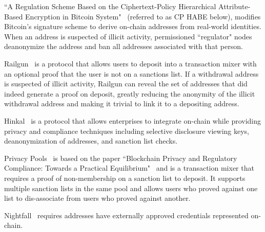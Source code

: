\documentclass[9pt]{extreport}
\begin{document}
``A Regulation Scheme Based on the Ciphertext-Policy Hierarchical Attribute-Based Encryption in Bitcoin System"~\cite{8314106} (referred to as CP HABE below), modifies Bitcoin's signature scheme to derive on-chain addresses from real-world identities.  When an address is suspected of illicit activity, permissioned ``regulator" nodes deanonymize the address and ban all addresses associated with that person.  

Railgun~\cite{railgun} is a protocol that allows users to deposit into a transaction mixer with an optional proof that the user is not on a sanctions list.  If a withdrawal address is suspected of illicit activity, Railgun can reveal the set of addresses that did indeed generate a proof on deposit, greatly reducing the anonymity of the illicit withdrawal address and making it trivial to link it to a depositing address.  

Hinkal~\cite{hinkal} is a protocol that allows enterprises to integrate on-chain while providing privacy and compliance techniques including selective disclosure viewing keys, deanonymization of addresses, and sanction list checks.  

Privacy Pools~\cite{privacypools} is based on the paper ``Blockchain Privacy and Regulatory Compliance: Towards a Practical Equilibrium"~\cite{buterin2023blockchain} and is a transaction mixer that requires a proof of non-membership on a sanction list to deposit.  It supports multiple sanction lists in the same pool and allows users who proved against one list to dis-associate from users who proved against another.  

Nightfall~\cite{ey2025blockchain} requires addresses have externally approved credentials represented on-chain.
\end{document}
